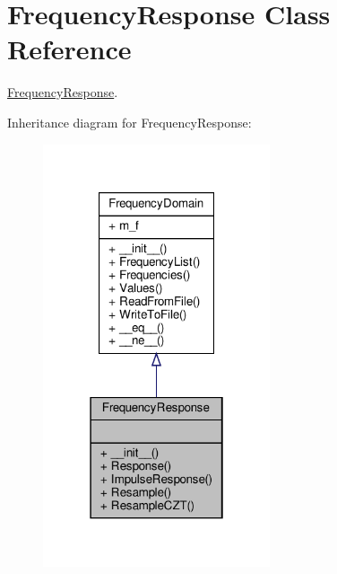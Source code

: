 \hypertarget{classSignalIntegrity_1_1FrequencyDomain_1_1FrequencyResponse_1_1FrequencyResponse}{}\section{Frequency\+Response Class Reference}
\label{classSignalIntegrity_1_1FrequencyDomain_1_1FrequencyResponse_1_1FrequencyResponse}


\hyperlink{classSignalIntegrity_1_1FrequencyDomain_1_1FrequencyResponse_1_1FrequencyResponse}{Frequency\+Response}.  




Inheritance diagram for Frequency\+Response\+:\nopagebreak
\begin{figure}[H]
\begin{center}
\leavevmode
\includegraphics[width=190pt]{classSignalIntegrity_1_1FrequencyDomain_1_1FrequencyResponse_1_1FrequencyResponse__inherit__graph}
\end{center}
\end{figure}



